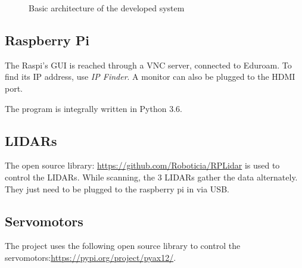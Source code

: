 \documentclass{article}
\newcommand{\vsp}{\vspace{\baselineskip}}
\begin{document}
\begin{figure}[H]
    \centering
    \caption{Basic architecture of the developed system}
    \label{fig:basic_architecture}
\end{figure}

\subsection{Raspberry Pi}

The Raspi's GUI is reached through a VNC server, connected to Eduroam. To find its IP address, use \textit{IP Finder}. A monitor can also be plugged to the HDMI port. 

\vsp

The program is integrally written in Python 3.6.

\subsection{LIDARs}

The open source library: \url{https://github.com/Roboticia/RPLidar} is used to control the LIDARs. While scanning, the 3 LIDARs gather the data alternately. They just need to be plugged to the raspberry pi in via USB.

\subsection{Servomotors}

The project uses the following open source library to control the servomotors:\url{https://pypi.org/project/pyax12/}. 
\end{document}
